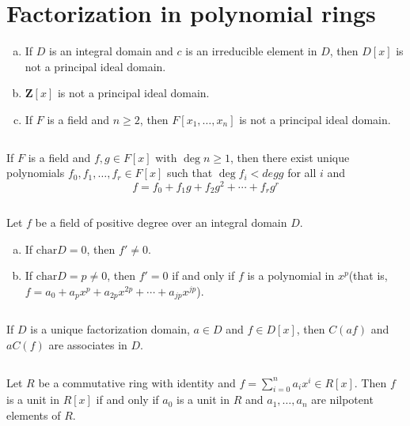 \section{Factorization in polynomial rings}
\begin{ex}
    \begin{enumerate}[(a)]
        \item If $D$ is an integral domain and $c$ is an irreducible element in $D$, then $D[x]$ is not a principal ideal domain.
        \item $\mathbf{Z}[x]$ is not a principal ideal domain.
        \item If $F$ is a field and $n\geq 2$, then $F[x_{1},\dots,x_{n}]$ is not a principal ideal domain.
    \end{enumerate}
\end{ex}

$$ $$

\begin{ex}
    If $F$ is a field and $f,g\in F[x]$ with $\deg n\geq 1$, then there exist unique polynomials $f_{0}, f_{1},\dots, f_{r}\in F[x]$ such that $\deg f_{i}<deg g$ for all $i$ and \[f=f_{0}+f_{1}g+f_{2}g^{2}+\cdots+f_{r}g^{r}\]
\end{ex}

$$ $$

\begin{ex}
    Let $f$ be a field of positive degree over an integral domain $D$.
    \begin{enumerate}[(a)]
        \item If $\mathrm{char} D=0$, then $f'\neq 0$.
        \item If $\mathrm{char} D=p\neq 0$, then $f'=0$ if and only if $f$ is a polynomial in $x^{p}$(that is, $f=a_{0}+a_{p}x^{p}+a_{2p}x^{2p}+\cdots+a_{jp}x^{jp}$).
    \end{enumerate}
\end{ex}

$$ $$

\begin{ex}
    If $D$ is a unique factorization domain, $a\in D$ and $f\in D[x]$, then $C(af)$ and $aC(f)$ are associates in $D$.
\end{ex}

$$ $$

\begin{ex}
    Let $R$ be a commutative ring with identity and $f=\sum\limits_{i=0}^{n}a_{i}x^{i}\in R[x]$. Then $f$ is a unit in $R[x]$ if and only if $a_{0}$ is a unit in $R$ and $a_{1},\dots,a_{n}$ are nilpotent elements of $R$.
\end{ex}

